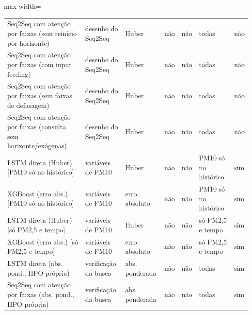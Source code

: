 \begin{table}[!htbp]
\begin{adjustbox}{max width=\textwidth}
\begin{tabular}{>{\raggedright\arraybackslash}p{}llllll}
        Seq2Seq com atenção por faixas (sem reinício por horizonte) & desenho do Seq2Seq & Huber & não & não & todas & não \\
        Seq2Seq com atenção por faixas (com input feeding) & desenho do Seq2Seq & Huber & não & não & todas & não \\
        Seq2Seq com atenção por faixas (sem faixas de defasagem) & desenho do Seq2Seq & Huber & não & não & todas & não \\
        Seq2Seq com atenção por faixas (consulta sem horizonte/exógenas) & desenho do Seq2Seq & Huber & não & não & todas & não \\
        LSTM direta (Huber) [PM10 só no histórico] & variáveis de PM10 & Huber & não & não & PM10 só no histórico & sim \\
        XGBoost (erro abs.) [PM10 só no histórico] & variáveis de PM10 & erro absoluto & não & não & PM10 só no histórico & sim \\
        LSTM direta (Huber) [só PM2,5 e tempo] & variáveis de PM10 & Huber & não & não & só PM2,5 e tempo & sim \\
        XGBoost (erro abs.) [só PM2,5 e tempo] & variáveis de PM10 & erro absoluto & não & não & só PM2,5 e tempo & sim \\
        LSTM direta (abs. pond., HPO própria) & verificação da busca & abs. ponderada & não & não & todas & sim \\
        Seq2Seq com atenção por faixas (abs. pond., HPO própria) & verificação da busca & abs. ponderada & não & não & todas & sim \\
        \bottomrule
    \end{tabular}
    \end{adjustbox}
\end{table}
